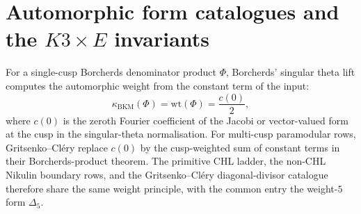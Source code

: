 \providecommand{\kBKM}{\kappa_{\mathrm{BKM}}}
\providecommand{\kch}{\kappa_{\mathrm{ch}}}
\providecommand{\kcat}{\kappa_{\mathrm{cat}}}
\providecommand{\kfib}{\kappa_{\mathrm{fiber}}}
\providecommand{\LII}{\Lambda^{2,1}_{II}}
\providecommand{\LIII}{\Lambda^{3,2}}
\providecommand{\fgDelta}{\mathfrak{g}_{\Delta_5}}
\providecommand{\YHall}{Y^+_{\mathrm{Hall}}}
\providecommand{\CoHA}{\mathrm{CoHA}}
\providecommand{\Winfty}{\mathcal W_{1+\infty}}
\providecommand{\ZOP}{Z_{\mathrm{OP}}}

\section*{Automorphic form catalogues and the \(K3\times E\) invariants}

For a single-cusp Borcherds denominator product \(\Phi\), Borcherds'
singular theta lift computes the automorphic weight from the constant
term of the input:
\[
  \kBKM(\Phi)=\mathrm{wt}(\Phi)=\frac{c(0)}{2},
\]
where \(c(0)\) is the zeroth Fourier coefficient of the Jacobi or
vector-valued form at the cusp in the singular-theta normalisation.
For multi-cusp paramodular rows, Gritsenko--Cl\'ery replace \(c(0)\) by
the cusp-weighted sum of constant terms in their Borcherds-product
theorem.  The primitive CHL ladder, the non-CHL Nikulin boundary rows,
and the Gritsenko--Cl\'ery diagonal-divisor catalogue therefore share the
same weight principle, with the common entry the weight-\(5\) form
\(\Delta_5\).

